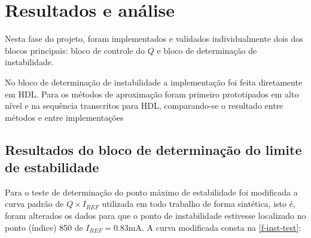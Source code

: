 








\chapter{Resultados e análise}\label{ch-res}

Nesta fase do projeto, foram implementados e validados individualmente dois dos blocos principais: bloco de controle do $Q$ e bloco de determinação de instabilidade.

No bloco de determinação de instabilidade a implementação foi feita diretamente em HDL. Para os métodos de aproximação foram primeiro prototipados em alto nível e na sequência transcritos para HDL, comparando-se o resultado entre métodos e entre implementações

\section{Resultados do bloco de determinação do limite de estabilidade}

Para o teste de determinação do ponto máximo de estabilidade foi modificada a curva padrão de $Q \times I_{REF}$ utilizada em todo trabalho de forma sintética, isto é, foram alterados os dados para que o ponto de instabilidade estivesse localizado no ponto (índice) 850 de $I_{REF} = 0.83$mA. A curva modificada consta na \autoref{f-inst-test}:

